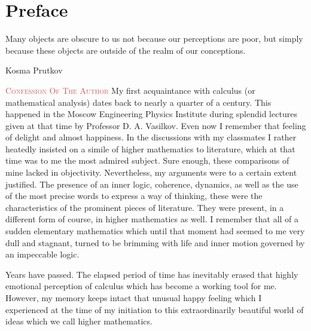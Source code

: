 
\chapter*{Preface}

\epigraph{Many objects are obscure to us not because our perceptions are poor, but simply because these objects are outside of the realm of our conceptions.}{Kosma Prutkov}

\textcolor{IndianRed}{\textsc{Confession Of The Author}} My first acquaintance with calculus (or mathematical analysis) dates back to nearly a quarter of a century. This happened in the Moscow Engineering Physics Institute during splendid lectures given at that time by Professor D. A. Vasilkov. Even now I remember that feeling of delight and almost happiness. In the discussions with my classmates I rather heatedly insisted on a simile of higher mathematics to literature, which at that time was to me the most admired subject. Sure enough, these comparisons of mine lacked in objectivity. Nevertheless, my arguments were to a certain extent justified. The presence of an inner logic, coherence, dynamics, as well as the use of the most precise words to express a way of thinking, these were the characteristics of the prominent pieces of literature. They were present, in a different form of course, in higher mathematics as well. I remember that all of a sudden elementary mathematics which until that moment had seemed to me very dull and stagnant, turned to be brimming with life and inner motion governed by an impeccable logic.

Years have passed. The elapsed period of time has inevitably erased that highly emotional perception of calculus which has become a working tool for me. However, my memory keeps intact that unusual happy feeling which I experienced at the time of my initiation to this extraordinarily beautiful world of ideas which we call higher mathematics.

